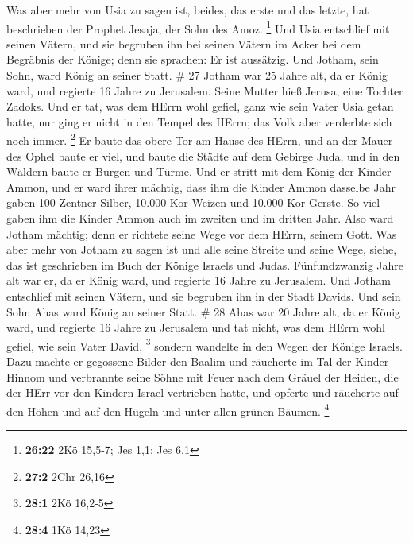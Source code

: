  Was aber mehr von Usia zu sagen ist, beides, das erste und
das letzte, hat beschrieben der Prophet Jesaja, der Sohn des Amoz.
\footnote{\textbf{26:22} 2Kö 15,5-7; Jes 1,1; Jes 6,1}  Und
Usia entschlief mit seinen Vätern, und sie begruben ihn bei seinen
Vätern im Acker bei dem Begräbnis der Könige; denn sie sprachen: Er ist
aussätzig. Und Jotham, sein Sohn, ward König an seiner Statt. \# 27
 Jotham war 25 Jahre alt, da er König ward, und regierte 16
Jahre zu Jerusalem. Seine Mutter hieß Jerusa, eine Tochter Zadoks.
 Und er tat, was dem HErrn wohl gefiel, ganz wie sein Vater
Usia getan hatte, nur ging er nicht in den Tempel des HErrn; das Volk
aber verderbte sich noch immer. \footnote{\textbf{27:2} 2Chr 26,16}
 Er baute das obere Tor am Hause des HErrn, und an der Mauer
des Ophel baute er viel,  und baute die Städte auf dem
Gebirge Juda, und in den Wäldern baute er Burgen und Türme. 
Und er stritt mit dem König der Kinder Ammon, und er ward ihrer mächtig,
dass ihm die Kinder Ammon dasselbe Jahr gaben 100 Zentner Silber, 10.000
Kor Weizen und 10.000 Kor Gerste. So viel gaben ihm die Kinder Ammon
auch im zweiten und im dritten Jahr.  Also ward Jotham
mächtig; denn er richtete seine Wege vor dem HErrn, seinem Gott.
 Was aber mehr von Jotham zu sagen ist und alle seine
Streite und seine Wege, siehe, das ist geschrieben im Buch der Könige
Israels und Judas.  Fünfundzwanzig Jahre alt war er, da er
König ward, und regierte 16 Jahre zu Jerusalem.  Und Jotham
entschlief mit seinen Vätern, und sie begruben ihn in der Stadt Davids.
Und sein Sohn Ahas ward König an seiner Statt. \# 28  Ahas
war 20 Jahre alt, da er König ward, und regierte 16 Jahre zu Jerusalem
und tat nicht, was dem HErrn wohl gefiel, wie sein Vater David,
\footnote{\textbf{28:1} 2Kö 16,2-5}  sondern wandelte in den
Wegen der Könige Israels. Dazu machte er gegossene Bilder den Baalim
 und räucherte im Tal der Kinder Hinnom und verbrannte seine
Söhne mit Feuer nach dem Gräuel der Heiden, die der HErr vor den Kindern
Israel vertrieben hatte,  und opferte und räucherte auf den
Höhen und auf den Hügeln und unter allen grünen Bäumen. \footnote{\textbf{28:4}
  1Kö 14,23}

